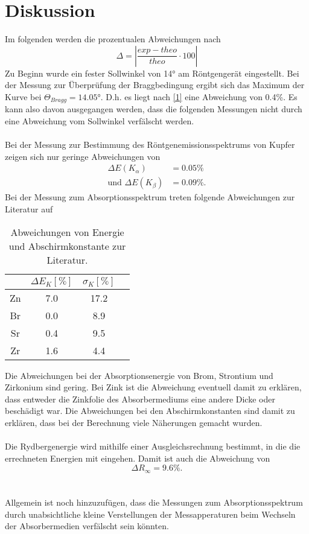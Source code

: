 \section{Diskussion}
\label{sec:Diskussion}
Im folgenden werden die prozentualen Abweichungen nach 
\begin{equation}\label{1}
    \Delta = |\frac{exp - theo}{theo} \cdot 100|
\end{equation}
Zu Beginn wurde ein fester Sollwinkel von 14° am Röntgengerät eingestellt. Bei der Messung zur Überprüfung der Braggbedingung 
ergibt sich das Maximum der Kurve bei $\Theta_{Bragg} = 14.05°$. D.h. es liegt nach \autoref{1} eine Abweichung von 0.4\%.
Es kann also davon ausgegangen werden, dass die folgenden Messungen nicht durch eine Abweichung vom Sollwinkel verfälscht werden.
\\
\\
Bei der Messung zur Bestimmung des Röntgenemissionsspektrums von Kupfer zeigen sich nur geringe Abweichungen von
\begin{align*}
    \Delta E(K_{\alpha}) &= 0.05\%\\
    \text{und } \Delta E(K_{\beta}) &= 0.09\%.
\end{align*}
Bei der Messung zum Absorptionsspektrum treten folgende Abweichungen zur Literatur \cite{energie_k} auf
\begin{table}\label{tab:2}
    \centering
    \begin{tabular}{c c c c}
        \toprule
        {} & {$\Delta E_{K}\left[\unit{\%}\right]$} & {$\sigma_{K}\left[\unit{\%}\right]$}\\
        \midrule
        Zn & 7.0 & 17.2\\
        Br & 0.0 & 8.9 \\
        Sr & 0.4 & 9.5 \\
        Zr & 1.6 & 4.4 \\       
        \bottomrule
    \end{tabular}
    \caption{Abweichungen von Energie und Abschirmkonstante zur Literatur.}
  \end{table}
Die Abweichungen bei der Absorptionsenergie von Brom, Strontium und Zirkonium sind gering. Bei Zink ist die Abweichung eventuell damit zu erklären, dass entweder die Zinkfolie
des Absorbermediums eine andere Dicke oder beschädigt war. 
Die Abweichungen bei den Abschirmkonstanten sind damit zu erklären, dass bei der Berechnung viele Näherungen gemacht wurden. 
\\
\\
Die Rydbergenergie wird mithilfe einer Ausgleichsrechnung bestimmt, in die die errechneten Energien mit eingehen. Damit ist auch die Abweichung von 
\begin{equation*}
    \Delta R_{\infty} = 9.6\%.
\end{equation*}
\\
\\
Allgemein ist noch hinzuzufügen, dass die Messungen zum Absorptionsspektrum durch unabsichtliche kleine Verstellungen der Messapperaturen beim Wechseln der
Absorbermedien verfälscht sein könnten. 